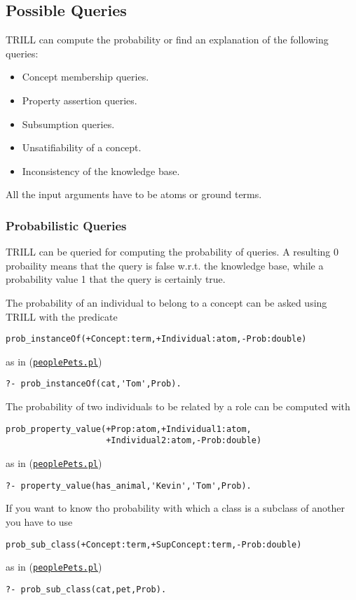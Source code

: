 \subsection{Possible Queries}
\label{queries}

TRILL can compute the probability or find an explanation of the following queries:
\begin{itemize}
  \item Concept membership queries.
  \item Property assertion queries.
  \item Subsumption queries.
  \item Unsatifiability of a concept.
  \item Inconsistency of the knowledge base.
\end{itemize}
All the input arguments have to be atoms or ground terms.

\subsubsection{Probabilistic Queries}
TRILL can be queried for computing the probability of queries. A resulting 0 probaility means that the query is false w.r.t. the knowledge base, while a probability value 1 that the query is certainly true.

The probability of an individual to belong to a concept can be asked using TRILL with the predicate
\begin{verbatim}
prob_instanceOf(+Concept:term,+Individual:atom,-Prob:double)
\end{verbatim}
as in (\href{http://trill.lamping.unife.it/example/trill/peoplePets.pl}{\texttt{peoplePets.pl}})
\begin{verbatim}
?- prob_instanceOf(cat,'Tom',Prob).
\end{verbatim}

The probability of two individuals to be related by a role can be computed with
\begin{verbatim}
prob_property_value(+Prop:atom,+Individual1:atom,
                    +Individual2:atom,-Prob:double)
\end{verbatim}
as in (\href{http://trill.lamping.unife.it/example/trill/peoplePets.pl}{\texttt{peoplePets.pl}})
\begin{verbatim}
?- property_value(has_animal,'Kevin','Tom',Prob).
\end{verbatim}

If you want to know tho probability with which a class is a subclass of another you have to use
\begin{verbatim}
prob_sub_class(+Concept:term,+SupConcept:term,-Prob:double)
\end{verbatim}
as in (\href{http://trill.lamping.unife.it/example/trill/peoplePets.pl}{\texttt{peoplePets.pl}})
\begin{verbatim}
?- prob_sub_class(cat,pet,Prob).
\end{verbatim}

